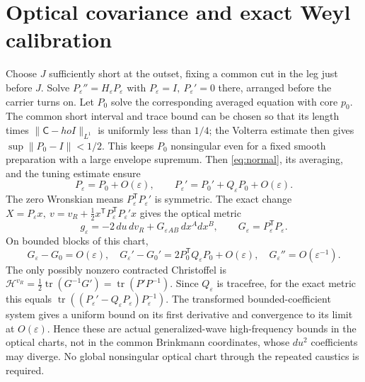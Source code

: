 \documentclass[11pt]{article}
\newcommand{\tr}{\operatorname{tr}}
\begin{document}
\section{Optical covariance and exact Weyl calibration}
Choose \(J\) sufficiently short at the outset, fixing a common cut in the leg just before \(J\). Solve \(P_\varepsilon''=H_\varepsilon P_\varepsilon\) with \(P_\varepsilon=I,\ P_\varepsilon'=0\) there, arranged before the carrier turns on. Let \(P_0\) solve the corresponding averaged equation with core \(p_0\). The common short interval and trace bound can be chosen so that its length times \(\|\mathsf C-
ho I\|_{L^1}\) is uniformly less than \(1/4\); the Volterra estimate then gives \(\sup\|P_0-I\|<1/2\). This keeps \(P_0\) nonsingular even for a fixed smooth preparation with a large envelope supremum. Then \eqref{eq:normal}, its averaging, and the tuning estimate ensure
\[
 P_\varepsilon=P_0+O(\varepsilon),\qquad
 P_\varepsilon'=P_0'+Q_\varepsilon P_0+O(\varepsilon).
\]
The zero Wronskian means \(P_\varepsilon^\mathsf{T}P_\varepsilon'\) is symmetric. The exact change \(X=P_\varepsilon x,\ v=v_R+\frac12 x^\mathsf{T}P_\varepsilon^\mathsf{T}P_\varepsilon'x\) gives the optical metric
\[
 g_\varepsilon=-2\,du\,dv_R+G_\varepsilon{}_{AB}\,dx^A dx^B,\qquad
 G_\varepsilon=P_\varepsilon^\mathsf{T}P_\varepsilon .
\]
On bounded blocks of this chart,
\[
 G_\varepsilon-G_0=O(\varepsilon),\quad
 G_\varepsilon'-G_0'=2P_0^\mathsf{T}Q_\varepsilon P_0+O(\varepsilon),\quad
 G_\varepsilon''=O(\varepsilon^{-1}).
\]
The only possibly nonzero contracted Christoffel is
\(\mathcal H^{v_R}=\tfrac12\tr(G^{-1}G')=\tr(P'P^{-1})\).
Since \(Q_\varepsilon\) is tracefree, for the exact metric this equals \(\tr((P_\varepsilon'-Q_\varepsilon P_\varepsilon)P_\varepsilon^{-1})\). The transformed bounded-coefficient system gives a uniform bound on its first derivative and convergence to its limit at \(O(\varepsilon)\). Hence these are actual generalized-wave high-frequency bounds in the optical charts, not in the common Brinkmann coordinates, whose \(du^2\) coefficients may diverge. No global nonsingular optical chart through the repeated caustics is required.
\end{document}
